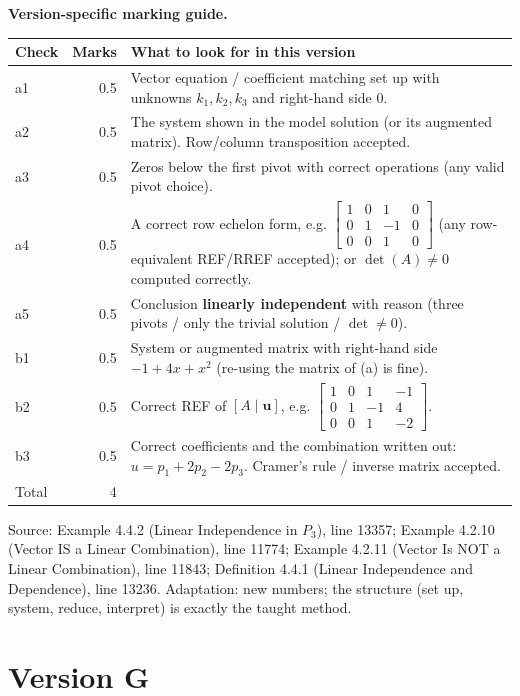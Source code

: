 \documentclass[11pt,a4paper]{article}
\newcommand{\Src}[1]{{\footnotesize\color{black!65}Source: #1}}
\begin{document}
\textbf{Version-specific marking guide.}\par
\begin{tabularx}{\linewidth}{@{}l r >{\raggedright\arraybackslash}X@{}}\toprule Check & Marks & What to look for in this version\\\midrule
a1 & 0.5 & Vector equation / coefficient matching set up with unknowns $k_1,k_2,k_3$ and right-hand side $0$.\\
a2 & 0.5 & The system shown in the model solution (or its augmented matrix). Row/column transposition accepted.\\
a3 & 0.5 & Zeros below the first pivot with correct operations (any valid pivot choice).\\
a4 & 0.5 & A correct row echelon form, e.g. $\left[\begin{array}{ccc|c} 1 & 0 & 1 & 0 \\ 0 & 1 & -1 & 0 \\ 0 & 0 & 1 & 0 \end{array}\right]$ (any row-equivalent REF/RREF accepted); or $\det(A)\neq0$ computed correctly.\\
a5 & 0.5 & Conclusion \textbf{linearly independent} with reason (three pivots / only the trivial solution / $\det\neq0$).\\
b1 & 0.5 & System or augmented matrix with right-hand side $-1+4x+x^{2}$ (re-using the matrix of (a) is fine).\\
b2 & 0.5 & Correct REF of $[A\mid\mathbf{u}]$, e.g. $\left[\begin{array}{ccc|c} 1 & 0 & 1 & -1 \\ 0 & 1 & -1 & 4 \\ 0 & 0 & 1 & -2 \end{array}\right]$.\\
b3 & 0.5 & Correct coefficients and the combination written out: $u=p_1+2p_2-2p_3$. Cramer's rule / inverse matrix accepted.\\
\midrule Total & 4 & \\\bottomrule\end{tabularx}
\Src{Example 4.4.2 (Linear Independence in $P_3$), line 13357; Example 4.2.10 (Vector IS a Linear Combination), line 11774; Example 4.2.11 (Vector Is NOT a Linear Combination), line 11843; Definition 4.4.1 (Linear Independence and Dependence), line 13236. Adaptation: new numbers; the structure (set up, system, reduce, interpret) is exactly the taught method.}\par
\clearpage\section*{Version G}
\end{document}
